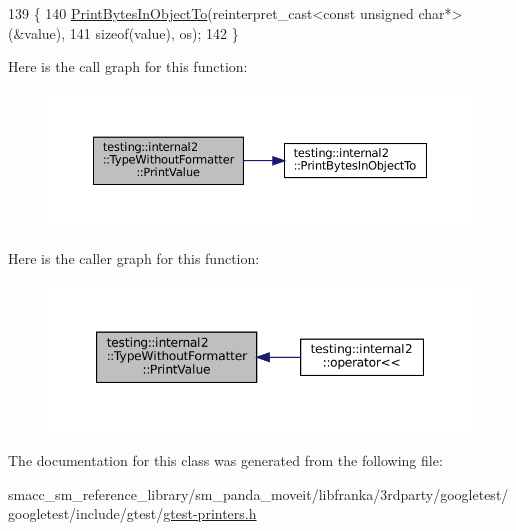 \begin{DoxyCode}
139                                                          \{
140     \hyperlink{namespacetesting_1_1internal2_a9fbf8e07c0f94dc74d6ef5e56cd3c553}{PrintBytesInObjectTo}(reinterpret\_cast<const unsigned char*>(&value),
141                          \textcolor{keyword}{sizeof}(value), os);
142   \}
\end{DoxyCode}
Here is the call graph for this function\+:
\nopagebreak
\begin{figure}[H]
\begin{center}
\leavevmode
\includegraphics[width=350pt]{classtesting_1_1internal2_1_1TypeWithoutFormatter_a6651f6f7be2c0f899729eeb6038f76d3_cgraph}
\end{center}
\end{figure}
Here is the caller graph for this function\+:
\nopagebreak
\begin{figure}[H]
\begin{center}
\leavevmode
\includegraphics[width=347pt]{classtesting_1_1internal2_1_1TypeWithoutFormatter_a6651f6f7be2c0f899729eeb6038f76d3_icgraph}
\end{center}
\end{figure}


The documentation for this class was generated from the following file\+:\begin{DoxyCompactItemize}
\item 
smacc\+\_\+sm\+\_\+reference\+\_\+library/sm\+\_\+panda\+\_\+moveit/libfranka/3rdparty/googletest/googletest/include/gtest/\hyperlink{gtest-printers_8h}{gtest-\/printers.\+h}\end{DoxyCompactItemize}
